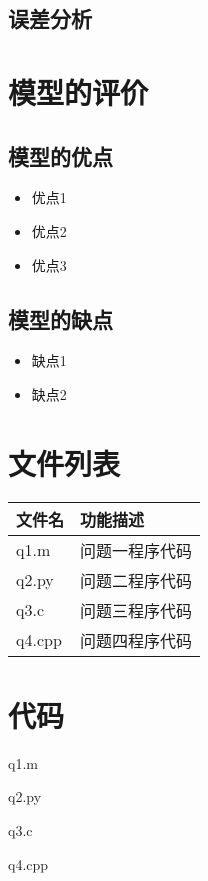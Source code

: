 \documentclass[withoutpreface,bwprint]{cumcmthesis}
\begin{document}
\subsection{误差分析}


\section{模型的评价}

\subsection{模型的优点}
\begin{itemize}[itemindent=2em]
\item 优点1
\item 优点2
\item 优点3
\end{itemize}

\subsection{模型的缺点}
\begin{itemize}[itemindent=2em]
\item 缺点1
\item 缺点2
\end{itemize}

\nocite{*}

\newpage
\begin{appendices}
\section{文件列表}
\begin{table}[H]
\centering
\begin{tabularx}{\textwidth}{LL}
\toprule
文件名   & 功能描述 \\
\midrule
q1.m & 问题一程序代码 \\
q2.py & 问题二程序代码 \\
q3.c & 问题三程序代码 \\
q4.cpp & 问题四程序代码 \\
\bottomrule
\end{tabularx}
\label{tab:文件列表}
\end{table}

\section{代码}
\noindent q1.m

q2.py

q3.c

q4.cpp

\end{appendices}
\end{document}

